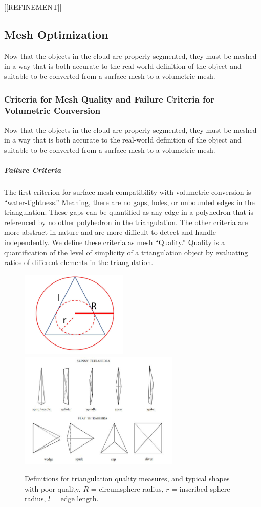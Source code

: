 \documentclass[12pt]{drexelthesis}
\let\Oldsubsection\subsection
\renewcommand{\subsection}{\FloatBarrier\Oldsubsection}
\let\Oldsubsubsection\subsubsection
\renewcommand{\subsubsection}{\FloatBarrier\Oldsubsubsection}
\begin{document}
[[REFINEMENT]]

\subsection{Mesh Optimization}
Now that the objects in the cloud are properly segmented, they must be meshed in a way that is both accurate to the real-world definition of the object and suitable to be converted from a surface mesh to a volumetric mesh.

\subsubsection{Criteria for Mesh Quality and Failure Criteria for Volumetric Conversion}
Now that the objects in the cloud are properly segmented, they must be meshed in a way that is both accurate to the real-world definition of the object and suitable to be converted from a surface mesh to a volumetric mesh.

\subparagraph{Failure Criteria}
The first criterion for surface mesh compatibility with volumetric conversion is “water-tightness.” Meaning, there are no gaps, holes, or unbounded edges in the triangulation. These gaps can be quantified as any edge in a polyhedron that is referenced by no other polyhedron in the triangulation.
The other criteria are more abstract in nature and are more difficult to detect and handle independently. We define these criteria as mesh “Quality.” Quality is a quantification of the level of simplicity of a triangulation object by evaluating ratios of different elements in the triangulation.

\begin{figure}[!ht]
	\centering
		\includegraphics[width=2in]{triangulation_definitions.JPG}
		\includegraphics[width=3in]{bad_tetrahedra.JPG}
		\caption[Definitions for triangulation quality measures]
		{\centering Definitions for triangulation quality measures, and typical shapes with poor quality. $R$ = circumsphere radius, $r$ = inscribed sphere radius, $l$ = edge length.}
		\label{fig:meshquality}
\end{figure}
\end{document}
